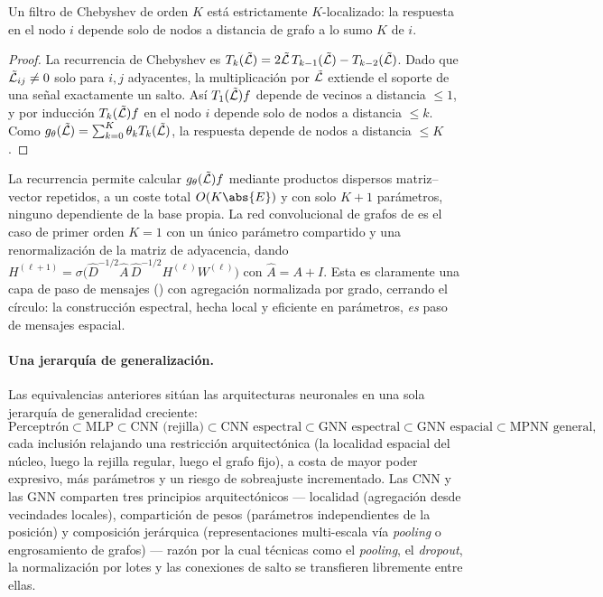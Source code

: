 \begin{theorem}
\label{thm:graphs:cheb-local}
Un filtro de Chebyshev de orden $K$ est\'a estrictamente $K$-localizado: la
respuesta en el nodo $i$ depende solo de nodos a distancia de grafo a lo sumo $K$
de $i$.
\end{theorem}

\begin{proof}
La recurrencia de Chebyshev es
$T_k(\tilde{\mathcal{L}}) = 2\tilde{\mathcal{L}}\, T_{k-1}(\tilde{\mathcal{L}}) - T_{k-2}(\tilde{\mathcal{L}})$. Dado
que $\tilde{\mathcal{L}}_{ij} \neq 0$ solo para $i, j$ adyacentes, la multiplicaci\'on por
$\tilde{\mathcal{L}}$ extiende el soporte de una se\~nal exactamente un salto. As\'i
$T_1(\tilde{\mathcal{L}}) f$ depende de vecinos a distancia $\le 1$, y por inducci\'on
$T_k(\tilde{\mathcal{L}}) f$ en el nodo $i$ depende solo de nodos a distancia $\le k$. Como
$g_\theta(\tilde{\mathcal{L}}) = \sum_{k=0}^K \theta_k T_k(\tilde{\mathcal{L}})$, la respuesta
depende de nodos a distancia $\le K$.
\end{proof}

La recurrencia permite calcular $g_\theta(\tilde{\mathcal{L}}) f$ mediante productos
dispersos matriz--vector repetidos, a un coste total $O(K\abs{E})$ y con solo
$K+1$ par\'ametros, ninguno dependiente de la base propia. La red convolucional de
grafos de \citet{kipf2017semi} es el caso de primer orden $K = 1$ con un \'unico
par\'ametro compartido y una renormalizaci\'on de la matriz de adyacencia, dando
$H^{(\ell+1)} = \sigma\!\big(\hat D^{-1/2} \hat A\, \hat D^{-1/2} H^{(\ell)}
W^{(\ell)}\big)$ con $\hat A = A + I$. Esta es claramente una capa de paso de
mensajes () con agregaci\'on normalizada por grado, cerrando
el c\'irculo: la construcci\'on espectral, hecha local y eficiente en
par\'ametros, \emph{es} paso de mensajes espacial.

\paragraph{Una jerarqu\'ia de generalizaci\'on.}
Las equivalencias anteriores sit\'uan las arquitecturas neuronales en una sola
jerarqu\'ia de generalidad creciente:
\[
  \text{Perceptr\'on} \subset \text{MLP} \subset \text{CNN (rejilla)}
    \subset \text{CNN espectral} \subset \text{GNN espectral}
    \subset \text{GNN espacial} \subset \text{MPNN general},
\]
cada inclusi\'on relajando una restricci\'on arquitect\'onica (la localidad
espacial del n\'ucleo, luego la rejilla regular, luego el grafo fijo), a costa de
mayor poder expresivo, m\'as par\'ametros y un riesgo de sobreajuste incrementado.
Las CNN y las GNN comparten tres principios arquitect\'onicos --- localidad
(agregaci\'on desde vecindades locales), compartici\'on de pesos (par\'ametros
independientes de la posici\'on) y composici\'on jer\'arquica (representaciones
multi-escala v\'ia \emph{pooling} o engrosamiento de grafos) --- raz\'on por la
cual t\'ecnicas como el \emph{pooling}, el \emph{dropout}, la normalizaci\'on por
lotes y las conexiones de salto se transfieren libremente entre ellas.

